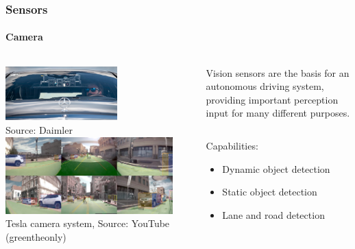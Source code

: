 \begin{frame}
\frametitle{Sensors}
\framesubtitle{Camera}
\begin{columns}[T]
    \begin{column}{.5\textwidth}
        \centering
        \includegraphics[width=0.6\textwidth]{images/daimler_cameras.jpg}\\
        \tiny{Source: Daimler\footnotemark[1]}\\
        \vspace{0.3cm}
        \href{https://www.youtube.com/watch?v=rACZACXgreQ}{
        \includegraphics[width=0.9\textwidth]{images/tesla_autopilot_cameras.jpg}}\\
        \tiny{Tesla camera system, Source: YouTube (greentheonly)\footnotemark[2]}
    \end{column}
    \begin{column}{.5\textwidth}
        \footnotesize
        Vision sensors are the basis for an autonomous driving system, providing
        important perception input for many different purposes.
        \vspace{0.25cm}
        \begin{columns}[T]
            \begin{column}{0.45\textwidth}
                \footnotesize
                Capabilities:
                \begin{itemize}
                    \item Dynamic object detection
                    \item Static object detection
                    \item Lane and road detection

\end{itemize}
\end{column}
\end{columns}
\end{column}
\end{columns}
\end{frame}

